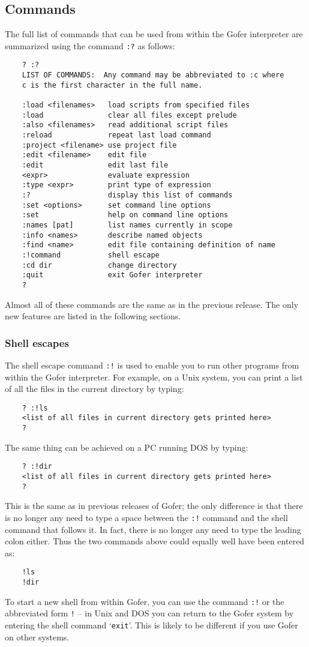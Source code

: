 \subsection{Commands}
The full list of commands that can be used from within the Gofer
interpreter are summarized using the command \verb":?" as follows:
\begin{verbatim}
    ? :?
    LIST OF COMMANDS:  Any command may be abbreviated to :c where
    c is the first character in the full name.

    :load <filenames>   load scripts from specified files
    :load               clear all files except prelude
    :also <filenames>   read additional script files
    :reload             repeat last load command
    :project <filename> use project file
    :edit <filename>    edit file
    :edit               edit last file
    <expr>              evaluate expression
    :type <expr>        print type of expression
    :?                  display this list of commands
    :set <options>      set command line options
    :set                help on command line options
    :names [pat]        list names currently in scope
    :info <names>       describe named objects
    :find <name>        edit file containing definition of name
    :!command           shell escape
    :cd dir             change directory
    :quit               exit Gofer interpreter
    ?
\end{verbatim}
Almost all of these commands are the same as in the previous release.
The only new features are listed in the following sections.


\subsubsection{Shell escapes}
The shell escape command \verb":!" is used to enable you to run other programs
from within the Gofer interpreter.  For example, on a Unix system, you
can print a list of all the files in the current directory by typing:
\begin{verbatim}
    ? :!ls
    <list of all files in current directory gets printed here>
    ?
\end{verbatim}
The same thing can be achieved on a PC running DOS by typing:
\begin{verbatim}
    ? :!dir
    <list of all files in current directory gets printed here>
    ?
\end{verbatim}
This is the same as in previous releases of Gofer; the only difference
is that there is no longer any need to type a space between the \verb":!"
command and the shell command that follows it.  In fact, there is no
longer any need to type the leading colon either.  Thus the two commands
above could equally well have been entered as:
\begin{verbatim}
    !ls
    !dir
\end{verbatim}
To start a new shell from within Gofer, you can use the command \verb":!" or the
abbreviated form \verb"!" -- in Unix and DOS you can return to the Gofer system
by entering the shell command `\verb"exit"'.  This is likely to be different if
you use Gofer on other systems.


